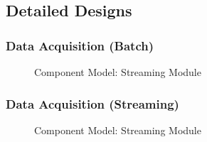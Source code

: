 \documentclass[12pt]{article} %
\begin{document}
	\subsection{Detailed Designs}
	
	\subsubsection{Data Acquisition (Batch)}
	
		\begin{figure}[H] %
			\caption{Component Model: Streaming Module}
			\label{fig:speciation}
		\end{figure}
	
	\subsubsection{Data Acquisition (Streaming)}
	
		\begin{figure}[H] %
			\caption{Component Model: Streaming Module}
			\label{fig:speciation}
		\end{figure}
	
\end{document}
